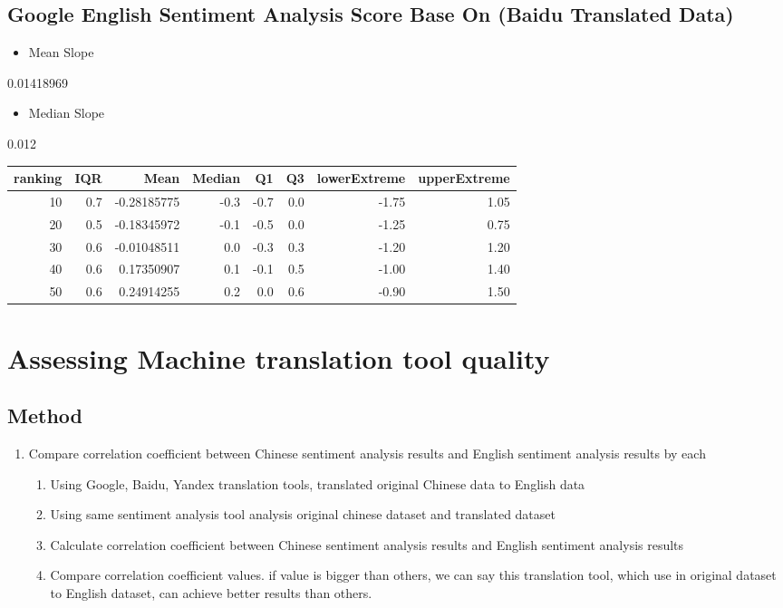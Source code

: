 \documentclass[conference,compsoc]{IEEEtran}
\begin{document}
\subsection{Google English Sentiment Analysis Score Base On (Baidu Translated Data)}
\label{sec:org56003d4}
\begin{itemize}
\item Mean Slope
\end{itemize}
0.01418969
\begin{itemize}
\item Median Slope
\end{itemize}
0.012
\begin{center}
\begin{tabular}{rrrrrrrr}
ranking & IQR & Mean & Median & Q1 & Q3 & lowerExtreme & upperExtreme\\
\hline
10 & 0.7 & -0.28185775 & -0.3 & -0.7 & 0.0 & -1.75 & 1.05\\
20 & 0.5 & -0.18345972 & -0.1 & -0.5 & 0.0 & -1.25 & 0.75\\
30 & 0.6 & -0.01048511 & 0.0 & -0.3 & 0.3 & -1.20 & 1.20\\
40 & 0.6 & 0.17350907 & 0.1 & -0.1 & 0.5 & -1.00 & 1.40\\
50 & 0.6 & 0.24914255 & 0.2 & 0.0 & 0.6 & -0.90 & 1.50\\
\end{tabular}
\end{center}
\section{Assessing Machine translation tool quality}
\label{sec:org20f5e88}

\subsection{Method}
\label{sec:org73e9c86}
\begin{enumerate}
\item Compare correlation coefficient between Chinese sentiment analysis results and English sentiment analysis results by each
\begin{enumerate}
\item Using Google, Baidu, Yandex translation tools, translated original Chinese data to English data
\item Using same sentiment analysis tool analysis original chinese dataset and translated dataset
\item Calculate correlation coefficient between Chinese sentiment analysis results and English sentiment analysis results
\item Compare correlation coefficient values. if value is bigger than others, we can say this translation tool, which use in original dataset to English dataset, can achieve better results than others.
\end{enumerate}
\end{enumerate}
\end{document}
